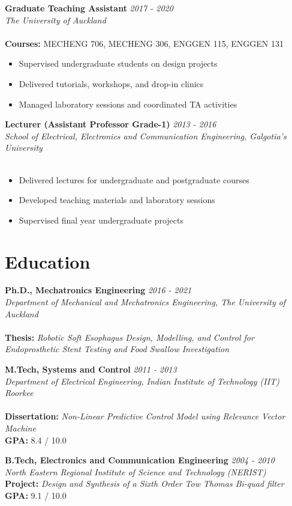 \documentclass[11pt,a4paper]{article}
\newcommand{\cvitem}[4]{
  \textbf{#1} \hfill \textit{#2}\\
  \textit{#3}\\
  #4
  \vspace{0.3cm}
}
\newcommand{\cvitemdetailed}[5]{
  \textbf{#1} \hfill \textit{#2}\\
  \textit{#3}\\
  \textbf{#4}\\
  #5
  \vspace{0.3cm}
}
\begin{document}
\cvitemdetailed{Graduate Teaching Assistant}{2017 - 2020}{The University of Auckland}{}{
\textbf{Courses:} MECHENG 706, MECHENG 306, ENGGEN 115, ENGGEN 131
\begin{itemize}[nosep,leftmargin=*]
  \item Supervised undergraduate students on design projects
  \item Delivered tutorials, workshops, and drop-in clinics
  \item Managed laboratory sessions and coordinated TA activities
\end{itemize}
}

\cvitemdetailed{Lecturer (Assistant Professor Grade-1)}{2013 - 2016}{School of Electrical, Electronics and Communication Engineering, Galgotia's University}{}{
\begin{itemize}[nosep,leftmargin=*]
  \item Delivered lectures for undergraduate and postgraduate courses
  \item Developed teaching materials and laboratory sessions
  \item Supervised final year undergraduate projects
\end{itemize}
}

\section*{Education}

\cvitemdetailed{Ph.D., Mechatronics Engineering}{2016 - 2021}{Department of Mechanical and Mechatronics Engineering, The University of Auckland}{}{
\textbf{Thesis:} \textit{Robotic Soft Esophagus Design, Modelling, and Control for Endoprosthetic Stent Testing and Food Swallow Investigation}
}

\cvitemdetailed{M.Tech, Systems and Control}{2011 - 2013}{Department of Electrical Engineering, Indian Institute of Technology (IIT) Roorkee}{}{
\textbf{Dissertation:} \textit{Non-Linear Predictive Control Model using Relevance Vector Machine}\\
\textbf{GPA:} 8.4 / 10.0
}

\cvitem{B.Tech, Electronics and Communication Engineering}{2004 - 2010}{North Eastern Regional Institute of Science and Technology (NERIST)}{
\textbf{Project:} \textit{Design and Synthesis of a Sixth Order Tow Thomas Bi-quad filter}\\
\textbf{GPA:} 9.1 / 10.0
}

\newpage
\end{document}
